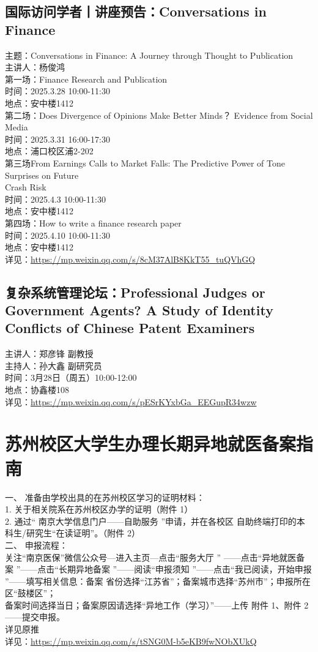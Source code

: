 \documentclass[letterpaper, 12pt]{article}
\begin{document}
\begin{multicols}{2}
\subsection{国际访问学者丨讲座预告：Conversations in Finance}
主题：Conversations in Finance: A Journey through Thought to Publication
\\主讲人：杨俊鸿
\\第一场：Finance Research and Publication
\\时间：2025.3.28 10:00-11:30
\\地点：安中楼1412
\\第二场：Does Divergence of Opinions Make Better Minds？ Evidence from Social Media 
\\时间：2025.3.31 16:00-17:30
\\地点：浦口校区浦2-202
\\第三场From Earnings Calls to Market Falls: The Predictive Power of Tone Surprises on Future
\\Crash Risk
\\时间：2025.4.3 10:00-11:30
\\地点：安中楼1412
\\第四场：How to write a finance research paper 
\\时间：2025.4.10 10:00-11:30
\\地点：安中楼1412
\\详见：\url{https://mp.weixin.qq.com/s/8cM37AlB8KkT55_tuQVhGQ}
\subsection{复杂系统管理论坛：Professional Judges or Government Agents? A Study of Identity Conflicts of Chinese Patent Examiners}
 主讲人：郑彦锋 副教授
 \\主持人：孙大鑫 副研究员
 \\时间：3月28日（周五）10:00-12:00
 \\地点：协鑫楼108
 \\详见：\url{https://mp.weixin.qq.com/s/pESrKYxbGa_EEGupR34wzw}

\section{苏州校区大学生办理长期异地就医备案指南}
一、 准备由学校出具的在苏州校区学习的证明材料：
\\1. 关于相关院系在苏州校区办学的证明（附件 1）
\\2. 通过“ 南京大学信息门户——自助服务 ”申请，并在各校区 自助终端打印的本科生/研究生“在读证明”。（附件 2）
\\二、 申报流程：
\\关注“南京医保”微信公众号---进入主页---点击“服务大厅 ” ——点击“异地就医备案 ”——点击“长期异地备案 ”——阅读“申报须知 ”——点击“我已阅读，开始申报 ”——填写相关信息：备案   省份选择“江苏省”；备案城市选择“苏州市”；申报所在区“鼓楼区”；
\\备案时间选择当日；备案原因请选择“异地工作（学习）”——上传 附件 1、附件 2——提交申报。
\\详见原推
\\详见：\url{https://mp.weixin.qq.com/s/tSNG0M-b5eKB9fwNObXUkQ}


\end{multicols}
\end{document}
